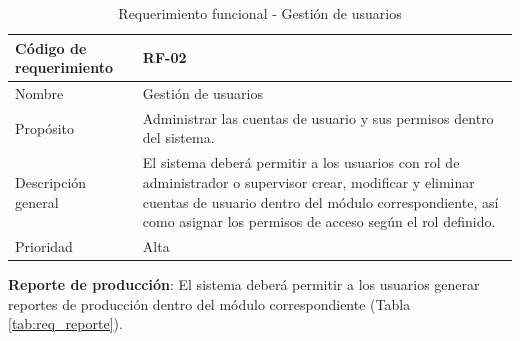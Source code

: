 \begin{table}[H]
    \centering
    \caption{Requerimiento funcional - Gestión de usuarios}
    \label{tab:req_usuarios}
    \begin{tabularx}{\textwidth}{|X|X|}
        \hline
        Código de requerimiento & RF-02                                                                                                                                                                                                                            \\ \hline
        Nombre                  & Gestión de usuarios                                                                                                                                                                                                              \\ \hline
        Propósito               & Administrar las cuentas de usuario y sus permisos dentro del sistema.                                                                                                                                                            \\ \hline
        Descripción general     & El sistema deberá permitir a los usuarios con rol de administrador o supervisor crear, modificar y eliminar cuentas de usuario dentro del módulo correspondiente, así como asignar los permisos de acceso según el rol definido. \\ \hline
        Prioridad               & Alta                                                                                                                                                                                                                             \\ \hline
    \end{tabularx}
\end{table}


\textbf{Reporte de producción}: El sistema deberá permitir a los usuarios generar reportes de producción dentro del módulo correspondiente (Tabla \ref{tab:req_reporte}).

